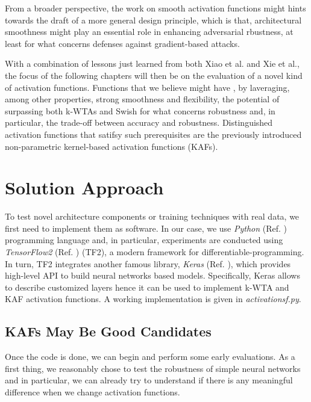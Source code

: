 \documentclass[LaM,binding=0.6cm]{./packages/sapthesis/sapthesis}
\begin{document}
    From a broader perspective, the work on smooth activation functions might
    hints towards the draft of a more general design principle, which is that,
    architectural smoothness might play an essential role in enhancing 
    adversarial rbustness, at least for what concerns defenses against 
    gradient-based attacks.

    With a combination of lessons just learned from both Xiao et al. and
    Xie et al., the focus of the following chapters will then be on the evaluation
    of a novel kind of activation functions. Functions that we believe might have 
    , by laveraging, among other properties, strong smoothness
    and flexibility, the potential of surpassing both k-WTAs and Swish 
    for what concerns robustness and, in particular, the trade-off
    between accuracy and robustness. Distinguished activation functions that 
    satifsy such prerequisites are the previously introduced non-parametric 
    kernel-based activation functions (KAFs). 



\chapter{Solution Approach}

    \label{chap:6}
    To test novel architecture components or training techniques with real data, we first need to implement them as software. In our case, 
    we use \textit{Python} (Ref. ) programming language and, in particular, experiments are conducted using \textit{TensorFlow2} (Ref. ) (TF2), a modern 
    framework for differentiable-programming. In turn, TF2 integrates another famous library, \textit{Keras} (Ref. ), which provides high-level 
    API to build neural networks based models. Specifically, Keras allows to describe customized layers hence it can be used to implement k-WTA and KAF
    activation functions. A working implementation is given in \textit{activationsf.py}.

    \section{KAFs May Be Good Candidates}

        Once the code is done, we can begin and perform some early evaluations. As a first thing, we reasonably chose to test the robustness of simple neural 
        networks and in particular, we can already try to understand if there is any meaningful difference when we change activation functions.
\end{document}
